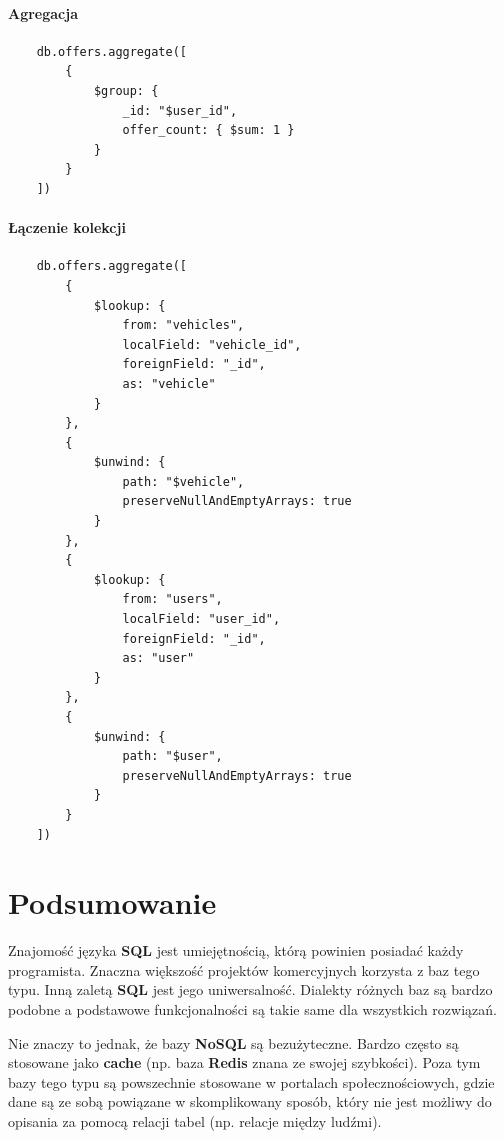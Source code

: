 \documentclass[a4paper,11pt]{article}
\begin{document}
\subsection*{Agregacja}
\begin{verbatim}
    db.offers.aggregate([
        {
            $group: {
                _id: "$user_id",
                offer_count: { $sum: 1 }
            }
        }
    ])
\end{verbatim}

\pagebreak
\subsection*{Łączenie kolekcji}
\begin{verbatim}
    db.offers.aggregate([
        {
            $lookup: {
                from: "vehicles",
                localField: "vehicle_id",
                foreignField: "_id",
                as: "vehicle"
            }
        },
        {
            $unwind: {
                path: "$vehicle",
                preserveNullAndEmptyArrays: true
            }
        },
        {
            $lookup: {
                from: "users",
                localField: "user_id",
                foreignField: "_id",
                as: "user"
            }
        },
        {
            $unwind: {
                path: "$user",
                preserveNullAndEmptyArrays: true
            }
        }
    ])
\end{verbatim}

\pagebreak
\part{Podsumowanie}
Znajomość języka \textbf{SQL} jest umiejętnością, którą powinien posiadać każdy programista. Znaczna większość projektów komercyjnych korzysta z baz tego typu.
Inną zaletą \textbf{SQL} jest jego uniwersalność. Dialekty różnych baz są bardzo podobne a podstawowe funkcjonalności są takie same dla wszystkich rozwiązań.

Nie znaczy to jednak, że bazy \textbf{NoSQL} są bezużyteczne. Bardzo często są stosowane jako \textbf{cache} (np. baza \textbf{Redis} znana ze swojej szybkości). Poza tym bazy tego typu są powszechnie stosowane w portalach społecznościowych,
gdzie dane są ze sobą powiązane w skomplikowany sposób, który nie jest możliwy do opisania za pomocą relacji tabel (np. relacje między ludźmi).
\end{document}
